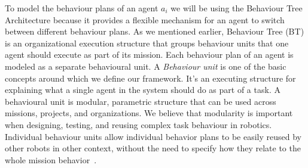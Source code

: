 \documentclass[journal]{IEEEtran}
\theoremstyle{definition}
\newcommand\patrizio[1]{\nb{Patrizio}{#1}}
\begin{document}
To model the behaviour plans of an agent $a_i$ we will be using the Behaviour Tree Architecture because it provides a flexible mechanism for an agent to switch between different behaviour plans.
As we mentioned earlier, Behaviour Tree (BT) is an organizational execution structure that groups behaviour units that one agent should execute as part of its mission. 
Each behaviour plan of an agent is modeled as a separate behavioural unit.
 A \textit{Behaviour unit} is one of the basic concepts around which we define our framework. It's an executing structure for explaining what a single agent in the system should do as part of a task. A behavioural unit is modular, parametric structure that can be used across missions, projects, and organizations.
We believe that modularity is important when designing, testing, and reusing complex task behaviour in robotics. Individual behaviour units allow individual
behavior plans to be easily reused by other robots in other context, without the need to specify how they relate to the whole mission behavior~\cite{colledanchise2017behavior}. %






 















\end{document}
